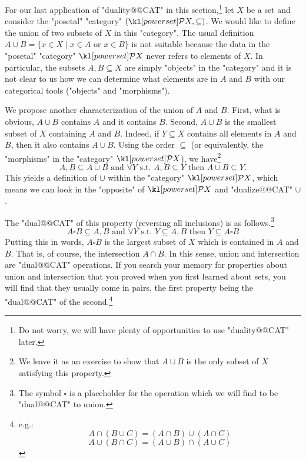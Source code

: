 \documentclass[main.tex]{subfiles}
\begin{document}
\begin{exmp}\label{exmp:unions}
For our last application of "duality@@CAT" in this section,\footnote{Do not worry, we will have plenty of opportunities to use "duality@@CAT" later.} let $X$ be a set and consider the "posetal" "category" $(\mP X, \subseteq)$. We would like to define the union of two subsets of $X$ in this "category". The usual definition $A \cup B = \{x \in X \mid x \in A \text{ or } x \in B\}$ is not suitable because the data in the "posetal" "category" $\mP X$ never refers to elements of $X$. In particular, the subsets $A,B \subseteq X$ are simply "objects" in the "category" and it is not clear to us how we can determine what elements are in $A$ and $B$ with our categorical tools ("objects" and "morphisms").

We propose another characterization of the union of $A$ and $B$. First, what is obvious, $A \cup B$ contains $A$ and it contains $B$. Second, $A \cup B$ is the smallest subset of $X$ containing $A$ and $B$. Indeed, if $Y \subseteq X$ contains all elements in $A$ and $B$, then it also contains $A \cup B$. Using the order $\subseteq$ (or equivalently, the "morphisms" in the "category" $\mP X$), we have\footnote{We leave it as an exercise to show that $A \cup B$ is the only subset of $X$ satisfying this property.} \[A, B \subseteq A\cup B \text{ and }\forall Y \text{ s.t. } A, B \subseteq Y \text{ then } A\cup B \subseteq Y.\] This yields a definition of $\cup$ within the "category" $\mP X$, which means we can look in the "opposite" of $\mP X$ and "dualize@@CAT" $\cup$.

The "dual@@CAT" of this property (reversing all inclusions) is as follows.\footnote{The symbol $\square$ is a placeholder for the operation which we will find to be "dual@@CAT" to union.}
\[ A \square B \subseteq A, B \text{ and } \forall Y \text{ s.t. } Y \subseteq A,B \text{ then } Y \subseteq A \square B\]
Putting this in words, $A \square B$ is the largest subset of $X$ which is contained in $A$ and $B$. That is, of course, the intersection $A \cap B$. In this sense, union and intersection are "dual@@CAT" operations. If you search your memory for properties about union and intersection that you proved when you first learned about sets, you will find that they usually come in pairs, the first property being the "dual@@CAT" of the second.\footnote{e.g.: \[A \cap (B \cup C) = (A \cap B) \cup (A \cap C)\]\[A \cup (B \cap C) = (A \cup B) \cap (A \cup C)\]}
\end{exmp}
\end{document}
